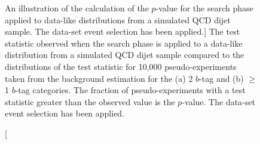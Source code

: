 \begin{figure}[!ht]
  \begin{center}
    \captionsetup[subfigure]{aboveskip=0pt,justification=centering}
  \end{center}
  \vspace{-1em}
  \caption
      [An illustration of the calculation of the \bh{} $p$-value for the search phase applied to data-like distributions from a simulated QCD dijet sample.
        The \summer{} data-set event selection has been applied.]
      {The \bh{} test statistic observed when the search phase is applied to a data-like distribution from a simulated QCD dijet sample
        compared to the distributions of the \bh{} test statistic for 10,000 pseudo-experiments taken from the background estimation for
        the (a) 2 $b$-tag and (b) $\geq$1 $b$-tag categories.
        The fraction of pseudo-experiments with a \bh{} test statistic greater than the observed value is the \bh{} \mbox{$p$-value}.
        The \summer{} data-set event selection has been applied.}
  \label{fig:DataLikeStatPlots_bh}
\end{figure}



